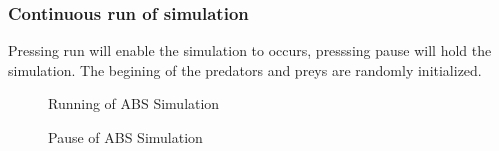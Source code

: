 \documentclass{article}
\begin{document}
\begin{normalsize}
\subsubsection{Continuous run of simulation}
Pressing run will enable the simulation to occurs, presssing pause will hold the simulation. The begining of the predators and preys are randomly initialized.
\begin{figure}[H]
	\caption{Running of ABS Simulation}
\end{figure}
\begin{figure}[H]
	\caption{Pause of ABS Simulation}
	\end{figure}

\newpage

\end{normalsize}
\end{document}
